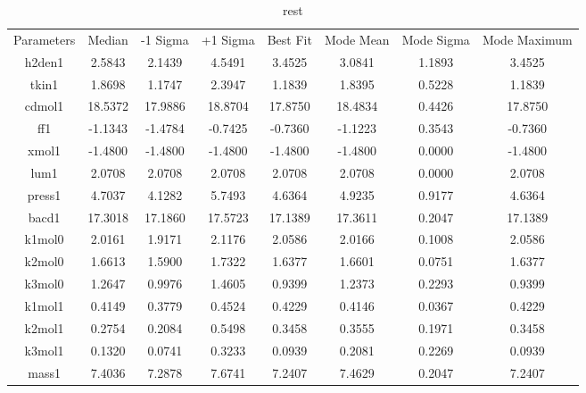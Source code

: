 \begin{table}
\caption{rest}
\begin{tabular}{cccccccc}
Parameters & Median & -1 Sigma & +1 Sigma & Best Fit & Mode Mean & Mode Sigma & Mode Maximum \\
h2den1 & 2.5843 & 2.1439 & 4.5491 & 3.4525 & 3.0841 & 1.1893 & 3.4525 \\
tkin1 & 1.8698 & 1.1747 & 2.3947 & 1.1839 & 1.8395 & 0.5228 & 1.1839 \\
cdmol1 & 18.5372 & 17.9886 & 18.8704 & 17.8750 & 18.4834 & 0.4426 & 17.8750 \\
ff1 & -1.1343 & -1.4784 & -0.7425 & -0.7360 & -1.1223 & 0.3543 & -0.7360 \\
xmol1 & -1.4800 & -1.4800 & -1.4800 & -1.4800 & -1.4800 & 0.0000 & -1.4800 \\
lum1 & 2.0708 & 2.0708 & 2.0708 & 2.0708 & 2.0708 & 0.0000 & 2.0708 \\
press1 & 4.7037 & 4.1282 & 5.7493 & 4.6364 & 4.9235 & 0.9177 & 4.6364 \\
bacd1 & 17.3018 & 17.1860 & 17.5723 & 17.1389 & 17.3611 & 0.2047 & 17.1389 \\
k1mol0 & 2.0161 & 1.9171 & 2.1176 & 2.0586 & 2.0166 & 0.1008 & 2.0586 \\
k2mol0 & 1.6613 & 1.5900 & 1.7322 & 1.6377 & 1.6601 & 0.0751 & 1.6377 \\
k3mol0 & 1.2647 & 0.9976 & 1.4605 & 0.9399 & 1.2373 & 0.2293 & 0.9399 \\
k1mol1 & 0.4149 & 0.3779 & 0.4524 & 0.4229 & 0.4146 & 0.0367 & 0.4229 \\
k2mol1 & 0.2754 & 0.2084 & 0.5498 & 0.3458 & 0.3555 & 0.1971 & 0.3458 \\
k3mol1 & 0.1320 & 0.0741 & 0.3233 & 0.0939 & 0.2081 & 0.2269 & 0.0939 \\
mass1 & 7.4036 & 7.2878 & 7.6741 & 7.2407 & 7.4629 & 0.2047 & 7.2407 \\
\end{tabular}
\end{table}
